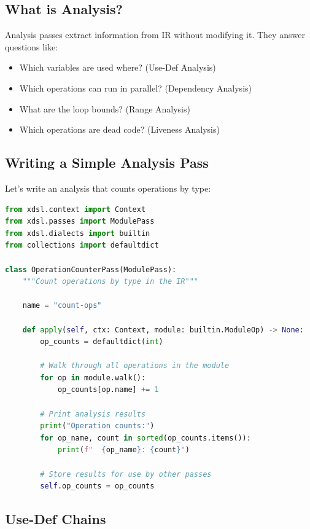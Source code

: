 \documentclass[11pt,a4paper]{article}
\begin{document}
\subsection{What is Analysis?}

Analysis passes extract information from IR without modifying it. They answer questions like:
\begin{itemize}
    \item Which variables are used where? (Use-Def Analysis)
    \item Which operations can run in parallel? (Dependency Analysis)
    \item What are the loop bounds? (Range Analysis)
    \item Which operations are dead code? (Liveness Analysis)
\end{itemize}

\subsection{Writing a Simple Analysis Pass}

Let's write an analysis that counts operations by type:

\begin{lstlisting}[language=Python, caption=Operation Counter Analysis]
from xdsl.context import Context
from xdsl.passes import ModulePass
from xdsl.dialects import builtin
from collections import defaultdict

class OperationCounterPass(ModulePass):
    """Count operations by type in the IR"""

    name = "count-ops"

    def apply(self, ctx: Context, module: builtin.ModuleOp) -> None:
        op_counts = defaultdict(int)

        # Walk through all operations in the module
        for op in module.walk():
            op_counts[op.name] += 1

        # Print analysis results
        print("Operation counts:")
        for op_name, count in sorted(op_counts.items()):
            print(f"  {op_name}: {count}")

        # Store results for use by other passes
        self.op_counts = op_counts
\end{lstlisting}

\subsection{Use-Def Chains}
\end{document}
